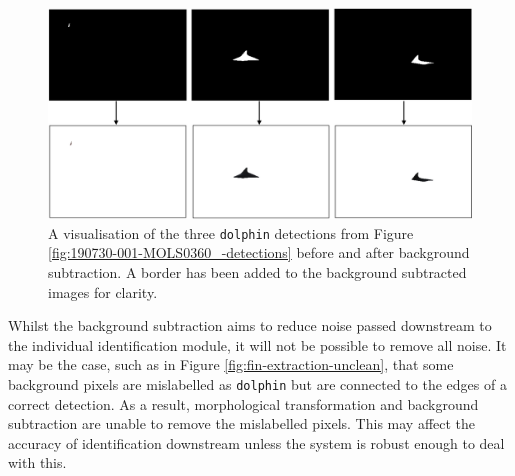 \begin{figure}
	\begin{center}
		\includegraphics[scale=0.45]{Chapter5/figs/190730-001-MOLS0360_-bg-subtraction.png}
	\end{center}
	\caption[A visualisation of the three \texttt{dolphin} detections from Figure \ref{fig:190730-001-MOLS0360_-detections} before and after background subtraction.]{A visualisation of the three \texttt{dolphin} detections from Figure \ref{fig:190730-001-MOLS0360_-detections} before and after background subtraction. A border has been added to the background subtracted images for clarity.}
	\label{fig:190730-001-MOLS0360_-bg-subtraction}
\end{figure}

Whilst the background subtraction aims to reduce noise passed downstream to the individual identification module, it will not be possible to remove all noise. It may be the case, such as in Figure \ref{fig:fin-extraction-unclean}, that some background pixels are mislabelled as \texttt{dolphin} but are connected to the edges of a correct detection. As a result, morphological transformation and background subtraction are unable to remove the mislabelled pixels. This may affect the accuracy of identification downstream unless the system is robust enough to deal with this.

